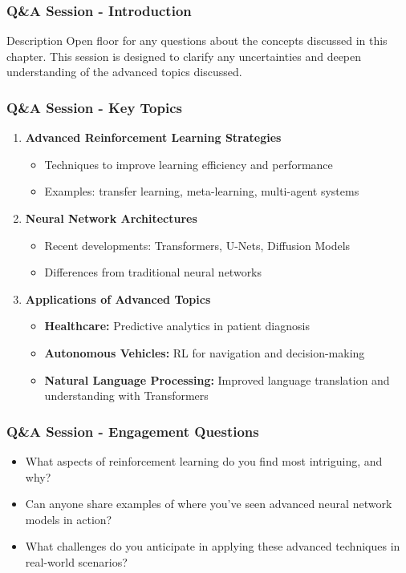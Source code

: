 \documentclass[aspectratio=169]{beamer}
\begin{document}
\begin{frame}[fragile]
    \frametitle{Q\&A Session - Introduction}
    \begin{block}{Description}
    Open floor for any questions about the concepts discussed in this chapter. 
    This session is designed to clarify any uncertainties and deepen understanding of the advanced topics discussed.
    \end{block}
\end{frame}

\begin{frame}[fragile]
    \frametitle{Q\&A Session - Key Topics}
    \begin{enumerate}
        \item \textbf{Advanced Reinforcement Learning Strategies}
        \begin{itemize}
            \item Techniques to improve learning efficiency and performance
            \item Examples: transfer learning, meta-learning, multi-agent systems
        \end{itemize}
        
        \item \textbf{Neural Network Architectures}
        \begin{itemize}
            \item Recent developments: Transformers, U-Nets, Diffusion Models
            \item Differences from traditional neural networks
        \end{itemize}
        
        \item \textbf{Applications of Advanced Topics}
        \begin{itemize}
            \item \textbf{Healthcare:} Predictive analytics in patient diagnosis
            \item \textbf{Autonomous Vehicles:} RL for navigation and decision-making
            \item \textbf{Natural Language Processing:} Improved language translation and understanding with Transformers
        \end{itemize}
    \end{enumerate}
\end{frame}

\begin{frame}[fragile]
    \frametitle{Q\&A Session - Engagement Questions}
    \begin{itemize}
        \item What aspects of reinforcement learning do you find most intriguing, and why?
        \item Can anyone share examples of where you’ve seen advanced neural network models in action?
        \item What challenges do you anticipate in applying these advanced techniques in real-world scenarios?
    \end{itemize}
\end{frame}
\end{document}
